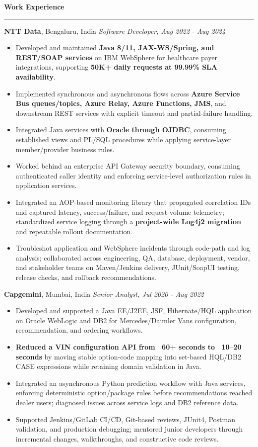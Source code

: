 \documentclass[11pt,letterpaper]{article}
\newcommand{\ressection}[1]{\Needspace{6\baselineskip}\vspace{8pt}\par\textbf{#1}\par\vspace{2pt}\hrule\vspace{5pt}}
\begin{document}
\ressection{Work Experience}
\textbf{NTT Data}, Bengaluru, India \hfill \textit{Software Developer, Aug 2022 - Aug 2024}
\begin{itemize}
  \item Developed and maintained \textbf{Java 8/11, JAX-WS/Spring, and REST/SOAP services} on IBM WebSphere for healthcare payer integrations, supporting \textbf{50K+ daily requests at 99.99\% SLA availability}.
  \item Implemented synchronous and asynchronous flows across \textbf{Azure Service Bus queues/topics, Azure Relay, Azure Functions, JMS}, and downstream REST services with explicit timeout and partial-failure handling.
  \item Integrated Java services with \textbf{Oracle through OJDBC}, consuming established views and PL/SQL procedures while applying service-layer member/provider business rules.
  \item Worked behind an enterprise API Gateway security boundary, consuming authenticated caller identity and enforcing service-level authorization rules in application services.
  \item Integrated an AOP-based monitoring library that propagated correlation IDs and captured latency, success/failure, and request-volume telemetry; standardized service logging through a \textbf{project-wide Log4j2 migration} and repeatable rollout documentation.
  \item Troubleshot application and WebSphere incidents through code-path and log analysis; collaborated across engineering, QA, database, deployment, vendor, and stakeholder teams on Maven/Jenkins delivery, JUnit/SoapUI testing, release checks, and rollback recommendations.
\end{itemize}
\textbf{Capgemini}, Mumbai, India \hfill \textit{Senior Analyst, Jul 2020 - Aug 2022}
\begin{itemize}
  \item Developed and supported a Java EE/J2EE, JSF, Hibernate/HQL application on Oracle WebLogic and DB2 for Mercedes/Daimler Vans configuration, recommendation, and ordering workflows.
  \item \textbf{Reduced a VIN configuration API from ~60+ seconds to ~10--20 seconds} by moving stable option-code mapping into set-based HQL/DB2 CASE expressions while retaining domain validation in Java.
  \item Integrated an asynchronous Python prediction workflow with Java services, enforcing deterministic option/package rules before recommendations reached dealer users; diagnosed issues across service logs and DB2 reference data.
  \item Supported Jenkins/GitLab CI/CD, Git-based reviews, JUnit4, Postman validation, and production debugging; mentored junior developers through incremental changes, walkthroughs, and constructive code reviews.
\end{itemize}
\end{document}
